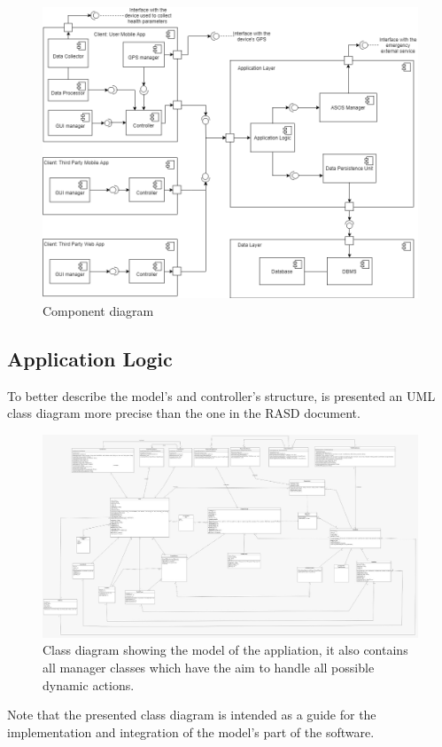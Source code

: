 \begin{figure}[h!]
	\includegraphics[width=1.0\textwidth]{./pictures/component_diagram.png}\par
	\caption{Component diagram}
\end{figure}
\FloatBarrier

\subsection{Application Logic}
To better describe the model's and controller's structure, is presented an UML class diagram more precise than the one in the RASD document. \\

\begin{figure}[h!]
	\includegraphics[width=1.0\textwidth]{./pictures/class_diagram.jpg}\par
	\caption{Class diagram showing the model of the appliation, it also contains all manager classes which have the aim to handle 			all possible dynamic actions.}
\end{figure}
\FloatBarrier
Note that the presented class diagram is intended as a guide for the implementation and integration of the model's part of the software.


